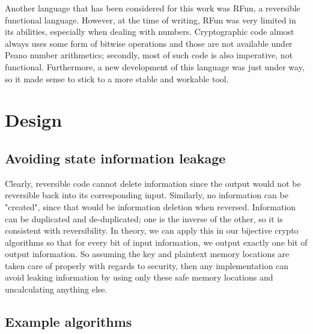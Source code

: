 \documentclass[a4paper,10pt,openright]{memoir}
\begin{document}
Another language that has been considered for this work was RFun, a 
reversible functional language. However, at the time of writing, RFun 
was very limited in its abilities, especially when dealing with 
numbers. Cryptographic code almost always uses some form of bitwise 
operations and those are not available under Peano number arithmetics; 
secondly, most of such code is also imperative, not functional. 
Furthermore, a new development of this language was just under way, so 
it made sense to stick to a more stable and workable tool.




\chapter{Design}


\section{Avoiding state information leakage}

Clearly, reversible code cannot delete information since the output 
would not be reversible back into its corresponding input. Similarly, 
no information can be "created", since that would be information 
deletion when reversed. Information can be duplicated and 
de-duplicated; one is the inverse of the other, so it is consistent 
with reversibility. In theory, we can apply this in our bijective 
crypto algorithms so that for every bit of input information, we output 
exactly one bit of output information. So assuming the key and 
plaintext memory locations are taken care of properly with regards to 
security, then any implementation can avoid leaking information by 
using only these safe memory locations and uncalculating anything else.

\section{Example algorithms}
\end{document}
